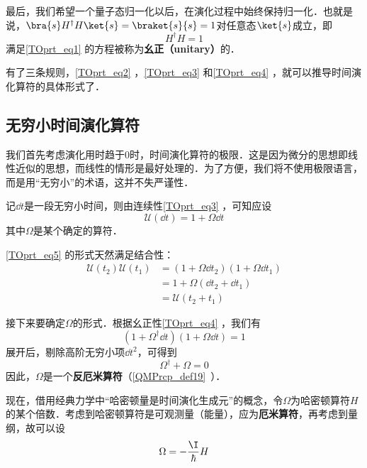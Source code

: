 最后，我们希望一个量子态归一化以后，在演化过程中始终保持归一化．也就是说，$\bra{s}H^\dagger H\ket{s}=\braket{s}{s}=1$对任意态$\ket{s}$成立，即
\begin{equation}\label{TOprt_eq4}
H^\dagger H=1
\end{equation}
满足\autoref{TOprt_eq1} 的方程被称为\textbf{幺正（unitary）}的．



有了三条规则，\autoref{TOprt_eq2} ，\autoref{TOprt_eq3} 和\autoref{TOprt_eq4} ，就可以推导时间演化算符的具体形式了．


\subsection{无穷小时间演化算符}

我们首先考虑演化用时趋于$0$时，时间演化算符的极限．这是因为微分的思想即线性近似的思想，而线性的情形是最好处理的．为了方便，我们将不使用极限语言，而是用“无穷小”的术语，这并不失严谨性．

记$\dd t$是一段无穷小时间，则由连续性\autoref{TOprt_eq3} ，可知应设
\begin{equation}\label{TOprt_eq5}
\mathcal{U}(\dd t) = 1+\Omega \dd t
\end{equation}
其中$\Omega$是某个确定的算符．

\autoref{TOprt_eq5} 的形式天然满足结合性：
\begin{equation}
\begin{aligned}
\mathcal{U}(t_2)\mathcal{U}(t_1)&=(1+\Omega \dd t_2)(1+\Omega \dd t_1)\\
&=1+\Omega(\dd t_2+\dd t_1)\\
&=\mathcal{U}(t_2+t_1)
\end{aligned}
\end{equation}

接下来要确定$\Omega$的形式．根据幺正性\autoref{TOprt_eq4} ，我们有
\begin{equation}
(1+\Omega^\dagger \dd t)(1+\Omega \dd t)=1
\end{equation}
展开后，剔除高阶无穷小项$\dd t^2$，可得到
\begin{equation}
\Omega^\dagger + \Omega = 0
\end{equation}
因此，$\Omega$是一个\textbf{反厄米算符}（\autoref{QMPrcp_def19}~）．


现在，借用经典力学中“哈密顿量是时间演化生成元”的概念，令$\Omega$为哈密顿算符$H$的某个倍数．考虑到哈密顿算符是可观测量（能量），应为\textbf{厄米算符}，再考虑到量纲，故可以设
\begin{equation}\label{TOprt_eq6}
\Omega=-\frac{\I}{\hbar}H
\end{equation}


